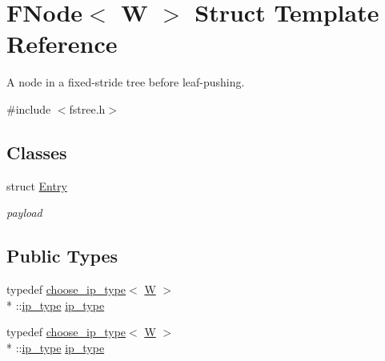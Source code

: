 \hypertarget{structFNode}{\section{F\-Node$<$ W $>$ Struct Template Reference}
\label{structFNode}
}


A node in a fixed-\/stride tree before leaf-\/pushing.  




{\ttfamily \#include $<$fstree.\-h$>$}

\subsection*{Classes}
\begin{DoxyCompactItemize}
\item 
struct \hyperlink{structFNode_1_1Entry}{Entry}
\begin{DoxyCompactList}\small\item\em payload \end{DoxyCompactList}\end{DoxyCompactItemize}
\subsection*{Public Types}
\begin{DoxyCompactItemize}
\item 
typedef \hyperlink{types_8h_structchoose__ip__type}{choose\-\_\-ip\-\_\-type}$<$ \hyperlink{test__u128_8cpp_ab21b528bc38899d04d3a7053e52fb797}{W} $>$\\*
\-::\hyperlink{structFNode_ae4ae2a97d6351584e0860a25b545cf94}{ip\-\_\-type} \hyperlink{structFNode_ae4ae2a97d6351584e0860a25b545cf94}{ip\-\_\-type}
\item 
typedef \hyperlink{types_8h_structchoose__ip__type}{choose\-\_\-ip\-\_\-type}$<$ \hyperlink{test__u128_8cpp_ab21b528bc38899d04d3a7053e52fb797}{W} $>$\\*
\-::\hyperlink{structFNode_ae4ae2a97d6351584e0860a25b545cf94}{ip\-\_\-type} \hyperlink{structFNode_ae4ae2a97d6351584e0860a25b545cf94}{ip\-\_\-type}
\end{DoxyCompactItemize}
